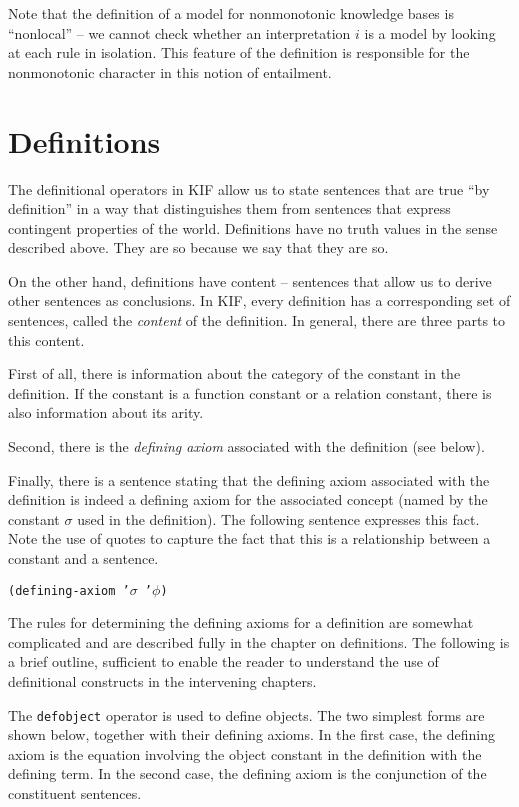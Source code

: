 Note that the definition of a model for nonmonotonic  knowledge bases is ``nonlocal''
-- we cannot check whether an interpretation $i$ is a model by looking at each
rule in isolation. This feature of the definition is responsible for the
nonmonotonic character in this notion of entailment.

\section{Definitions}

The definitional operators in KIF allow us to state sentences that are true ``by
definition'' in a way that distinguishes them from sentences that express contingent
properties of the world.  Definitions have no truth values in the sense described
above.  They are so because we say that they are so.  

On the other hand, definitions have content -- sentences that allow us to derive
other sentences as conclusions.  In KIF, every definition has a corresponding
set of sentences, called the {\it content} of the definition.  In general, there are
three parts to this content.  

First of all, there is information about the category of the constant in the
definition.  If the constant is a function constant or a relation constant, there is
also information about its arity.  

Second, there is the {\it defining axiom} associated with the definition (see
below).  

Finally, there is a sentence stating that the defining axiom associated with the
definition is indeed a defining axiom for the associated concept (named by the
constant $\sigma$ used in the definition).  The following sentence expresses this
fact.  Note the use of quotes to capture the fact that this is a relationship between
a constant and a sentence.

\medskip
{\tt (defining-axiom '$\sigma$ '$\phi$)}
\medskip

The rules for determining the defining axioms for a definition are somewhat
complicated and are described fully in the chapter on definitions.  The following is a
brief outline, sufficient to enable the reader to understand the use of definitional
constructs in the intervening chapters.

The {\tt defobject} operator is used to define objects.  The two simplest forms are
shown below, together with their defining axioms.  In the first case, the defining
axiom is the equation involving the object constant in the definition with the
defining term.  In the second case, the defining axiom is the conjunction
of the constituent sentences.

